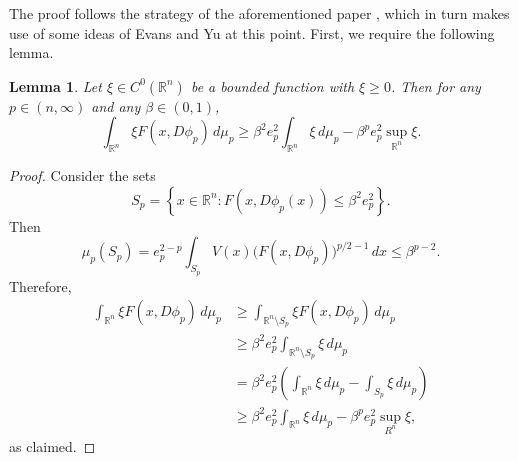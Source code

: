 \documentclass[a4paper]{article}
\newcommand{\R}{\mathbb{R}}
\newcommand{\set}[2]{\left\{ #1 \colon #2 \right\}}
\newtheorem{lemma}[theorem]{Lemma}
\theoremstyle{definition}
\theoremstyle{remark}
\begin{document}
The proof follows the strategy of the aforementioned paper \cite{Katzourakis-Moser:25}, which in turn
makes use of some ideas of Evans and Yu \cite{Evans-Yu:05} at this point. First, we require the following lemma.

\begin{lemma} \label{lem:cut-off}
Let $\xi \in C^0(\R^n)$ be a bounded function with $\xi \ge 0$.
Then for any $p \in (n, \infty)$ and any $\beta \in (0, 1)$,
\[
\int_{\R^n} \xi F(x, D\phi_p) \, d\mu_p \ge \beta^2 e_p^2 \int_{\R^n} \xi \, d\mu_p - \beta^p e_p^2 \sup_{\R^n} \xi.
\]
\end{lemma}

\begin{proof}
Consider the sets
\[
S_p = \set{x \in \R^n}{F(x, D\phi_p(x)) \le \beta^2 e_p^2}.
\]
Then
\[
\mu_p(S_p) = e_p^{2 - p} \int_{S_p} V(x) \bigl(F(x, D\phi_p)\bigr)^{p/2 - 1} \, dx \le \beta^{p - 2}.
\]
Therefore,
\[
\begin{split}
\int_{\R^n} \xi F(x, D\phi_p) \, d\mu_p & \ge \int_{\R^n \setminus S_p} \xi F(x, D\phi_p) \, d\mu_p \\
& \ge \beta^2 e_p^2 \int_{\R^n \setminus S_p} \xi \, d\mu_p \\
& = \beta^2 e_p^2 \left(\int_{\R^n} \xi \, d\mu_p - \int_{S_p} \xi \, d\mu_p\right) \\
& \ge \beta^2 e_p^2 \int_{\R^n} \xi \, d\mu_p - \beta^p e_p^2 \sup_{R^n} \xi,
\end{split}
\]
as claimed.
\end{proof}
\end{document}
